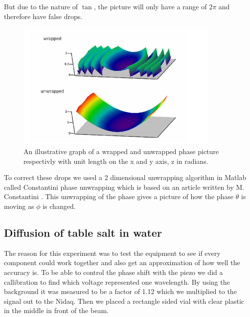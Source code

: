 But due to the nature of $\tan$, the picture will only have a range of $2\pi$
and therefore have false drops. 
\begin {figure}[ht!]
\includegraphics [width=10cm]{bilder/unwrap.png}
\caption {\cite{omst}An illustrative graph of a wrapped and unwrapped phase picture respectivly 
with unit length on the x and y axis, z in radians.}
\end {figure}
To correct these drops we used a 2 dimensional unwrapping algorithm in Matlab called
Constantini phase unwrapping which is based on an article written by M. Constantini 
\cite{const}. This unwrapping of the phase gives a picture of how the phase $\theta$ is moving
as $\phi$ is changed. 

\subsection {Diffusion of table salt in water}

The reason for this experiment was to test the equipment to see if every component
could work together and also get an approximation of how well the accuracy is.
To be able to control the phase shift with the piezo we did a callibration to find
which voltage represented one wavelength. By using the background it was measured to
be a factor of 1.12 which we multiplied to the signal out to the Nidaq. Then we placed a rectangle 
sided vial with clear plastic in the middle in front of the beam.

